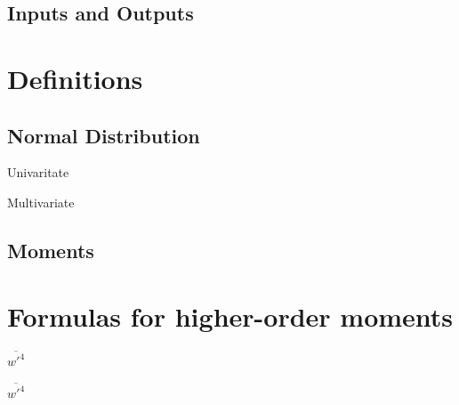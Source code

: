 \documentclass[10pt]{beamer}
\begin{document}
    \begin{frame}{}

    \end{frame}

    \subsection{Inputs and Outputs}\label{subsec:inputs-and-outputs}

    \begin{frame}{}

    \end{frame}


    \section{Definitions}\label{sec:definitions}

    \subsection{Normal Distribution}\label{subsec:normal-distribution}

    \begin{frame}{Univaritate}

    \end{frame}

    \begin{frame}{Multivariate}

    \end{frame}

    \subsection{Moments}\label{subsec:moments}

    \begin{frame}{}

    \end{frame}


    \section{Formulas for higher-order moments}\label{sec:formulas-for-higher-order-moments}

    \begin{frame}{$\overline{w'^4}$}

    \end{frame}

    \begin{frame}{$\overline{w'^4}$}

    \end{frame}
\end{document}

